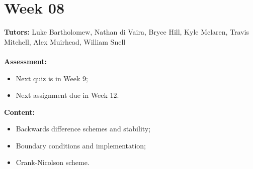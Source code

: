 \documentclass[11pt,a4paper]{report}
\begin{document}
	
	\begingroup
	\makeatletter
	\let\clearpage\relax
	\vspace*{\fill}%
	\vspace*{\dimexpr-50\p@-\baselineskip}
	\chapter*{Week 08}
	\textbf{Tutors:} Luke Bartholomew, Nathan di Vaira, Bryce Hill, Kyle Mclaren, Travis Mitchell, Alex Muirhead, William Snell \\\\
	\textbf{Assessment:} 
	\begin{itemize}
		\item Next quiz is in Week 9;
		\item Next assignment due in Week 12. 
	\end{itemize}	
	\textbf{Content:}
	\begin{itemize}
		\item Backwards difference schemes and stability;
		\item Boundary conditions and implementation;
		\item Crank-Nicolson scheme.
	\end{itemize}
	\vspace*{\fill}
	\endgroup
	
	
\end{document}
